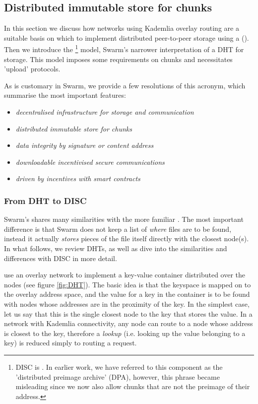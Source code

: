 \subsection{Distributed immutable store for chunks\statusgreen}\label{sec:disc}
 
In this section we discuss how networks using Kademlia overlay routing are a suitable basis on which to implement distributed peer-to-peer storage using a  (). Then we introduce the %
%
\footnote{DISC is . In earlier work, we have referred to this component as the 'distributed preimage archive' (DPA), however, this phrase became misleading since we now also allow chunks that are not the preimage of their address.}
% 
model, Swarm's narrower interpretation of a DHT for storage. This model 
imposes some requirements on chunks and necessitates 'upload' protocols. 

As is customary in Swarm, we provide a few resolutions of this acronym, which summarise the most important features:


\begin{itemize}
\item \emph{decentralised infrastructure for storage and communication} 
\item \emph{distributed immutable store for chunks} 
\item \emph{data integrity by signature or content address}
\item \emph{downloadable incentivised secure communications}
\item \emph{driven by incentives with smart contracts} 

\end{itemize}
 
\subsubsection{From DHT to DISC}
Swarm's  shares many similarities with the more familiar . The most important difference is that Swarm does not keep a list of \emph{where} files are to be found, instead it actually \emph{stores} pieces of the file itself directly with the closest node(s). 
In what follows, we review DHTs, as well as dive into the similarities and differences with DISC in more detail. 
 
 use an overlay network to implement a key-value container distributed over the nodes (see figure \ref{fig:DHT}). The basic idea is that the keyspace is mapped on to the overlay address space, and the value for a key in the container is to be found with nodes whose addresses are in the proximity of the key. In the simplest case, let us say that this is the single closest node to the key that stores the value. In a network with Kademlia connectivity, any node can route to a node whose address is closest to the key, therefore a \emph{lookup} (i.e. looking up the value belonging to a key) is reduced simply to routing a request. 

